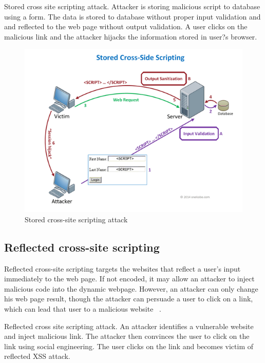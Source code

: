 Stored cross site scripting attack. Attacker is storing malicious script to database using a form. The data is stored to database without proper input validation and and reflected to the web page without output validation. A user clicks on the malicious link and the attacker hijacks the information stored in user?s browser.

\begin{figure}[htb]
\centering
\includegraphics[width=1.0\textwidth]{image/sxss.png}
\caption[Stored cross-site scripting attack]{Stored cross-site scripting attack ~\cite{g14}} 
\label{fig:sxss}
\end{figure}

\subsection{Reflected cross-site scripting}

Reflected cross-site scripting targets the websites that reflect a user's input immediately to the web page. If not encoded, it may allow an attacker to inject malicious code into the dynamic webpage. However, an attacker can only change his web page result, though the attacker can persuade a user to click on a link, which can lead that user to a malicious website ~\cite{g13}.


Reflected cross site scripting attack. An attacker identifies a vulnerable website and inject malicious link. The attacker then convinces the user to click on the link using social engineering. The user clicks on the link and becomes victim of reflected XSS attack. 


